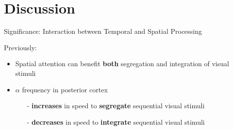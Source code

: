 \section{Discussion}

 \frame{\sectionpage}

\begin{frame}{Significance: Interaction between Temporal and Spatial Processing}

    Previously:
    \begin{itemize}
        \item<2-> Spatial attention can benefit \textcolor{lightlavender}{\textbf{both}} segregation and integration of visual stimuli
        \item<3-> $\alpha$ frequency in posterior cortex 
        \begin{itemize}
            \item[-] \textcolor{lightlavender}{\textbf{increases}} in speed to \textcolor{lightlavender}{\textbf{segregate}} sequential visual stimuli
            \item[-] \textcolor{lightlavender}{\textbf{decreases}} in speed to \textcolor{lightlavender}{\textbf{integrate}} sequential visual stimuli
        \end{itemize}
    \end{itemize}


\end{frame}

